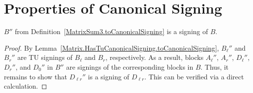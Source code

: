 \section{Properties of Canonical Signing}

\begin{lemma}
    \label{MatrixSum3.HasCanonicalSigning.toCanonicalSigning}
    \leanok
    $B''$ from Definition~\ref{MatrixSum3.toCanonicalSigning} is a signing of $B$.
\end{lemma}

\begin{proof}
    By Lemma~\ref{Matrix.HasTuCanonicalSigning.toCanonicalSigning}, $B_{\ell}''$ and $B_{r}''$ are TU signings of $B_{\ell}$ and $B_{r}$, respectively. As a result, blocks $A_{\ell}''$, $A_{r}''$, $D_{\ell}''$, $D_{r}''$, and $D_{0}''$ in $B''$ are signings of the corresponding blocks in $B$. Thus, it remains to show that $D_{\ell r}''$ is a signing of $D_{\ell r}$. This can be verified via a direct calculation. 
\end{proof}

